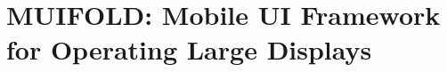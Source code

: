 \chapter{MUIFOLD: Mobile UI 
Framework for Operating Large Displays}\label{chap:muifold}















